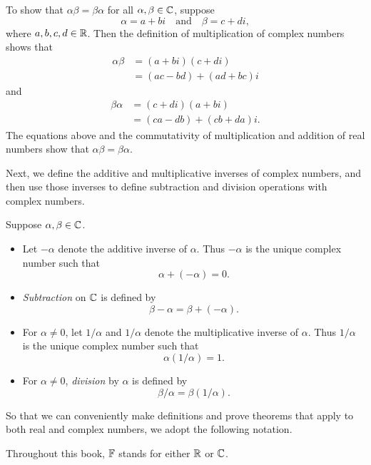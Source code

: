 \begin{example}\label{ax:1.4}
To show that $\alpha\beta=\beta\alpha$ for all $\alpha,\beta\in\mathbb{C}$, suppose
\[ \alpha = a+bi \quad\text{and}\quad \beta = c+di, \]
where $a,b,c,d\in\mathbb{R}$. Then the definition of multiplication of complex numbers
shows that
\begin{align*}
\alpha\beta &= (a+bi)(c+di)\\
            &= (ac-bd)+(ad+bc)i
\end{align*}
and
\begin{align*}
\beta\alpha &= (c+di)(a+bi)\\
            &= (ca-db)+(cb+da)i.
\end{align*}
The equations above and the commutativity of multiplication and addition of
real numbers show that $\alpha\beta=\beta\alpha$.
\end{example}

Next, we define the additive and multiplicative inverses of complex numbers,
and then use those inverses to define subtraction and division operations with
complex numbers.

\begin{definition}\label{ax:1.5}\leavevmode
Suppose $\alpha,\beta\in\mathbb{C}$.
\begin{itemize}
\item Let $-\alpha$ denote the additive inverse of $\alpha$. Thus $-\alpha$ is
  the unique complex number such that
  \[ \alpha+(-\alpha)=0. \]
\item \emph{Subtraction} on $\mathbb{C}$ is defined by
  \[ \beta-\alpha = \beta+(-\alpha). \]
\item For $\alpha\ne0$, let $1/\alpha$ and $1/\alpha$ denote the
  multiplicative inverse of $\alpha$. Thus $1/\alpha$ is the unique complex
  number such that
  \[ \alpha(1/\alpha)=1. \]
\item For $\alpha\ne0$, \emph{division} by $\alpha$ is defined by
  \[ \beta/\alpha = \beta(1/\alpha). \]
\end{itemize}
\end{definition}

So that we can conveniently make definitions and prove theorems that apply to
both real and complex numbers, we adopt the following notation.

\begin{notation}[$\F$]\label{ax:1.6}
Throughout this book, $\F$ stands for either $\mathbb{R}$ or $\mathbb{C}$.
\end{notation}

